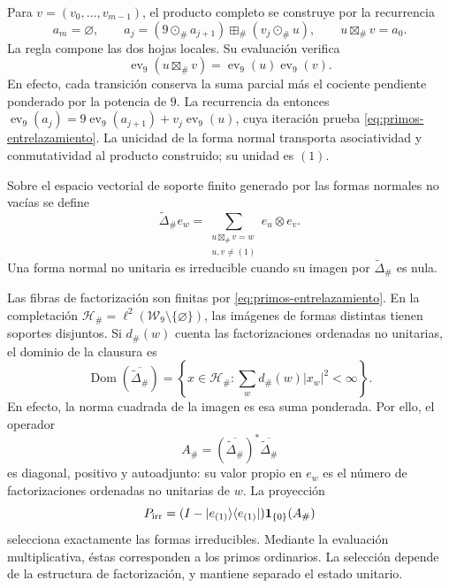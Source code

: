 Para \(v=(v_0,\ldots,v_{m-1})\), el producto completo se construye por
la recurrencia
\[
 a_m=\varnothing,\qquad
 a_j=(9\odot_\#a_{j+1})\boxplus_\#(v_j\odot_\#u),
 \qquad u\boxtimes_\#v=a_0.
\]
La regla compone las dos hojas locales. Su evaluación verifica
\begin{equation}
 \operatorname{ev}_9(u\boxtimes_\#v)
   =\operatorname{ev}_9(u)\operatorname{ev}_9(v).
 \label{eq:primos-entrelazamiento}
\end{equation}
En efecto, cada transición conserva la suma parcial más el cociente
pendiente ponderado por la potencia de \(9\). La recurrencia da entonces
\(\operatorname{ev}_9(a_j)=9\operatorname{ev}_9(a_{j+1})+
v_j\operatorname{ev}_9(u)\), cuya iteración prueba
\eqref{eq:primos-entrelazamiento}. La unicidad de la forma normal transporta
asociatividad y conmutatividad al producto construido; su unidad es \((1)\).

\begin{definition}
Sobre el espacio vectorial de soporte finito generado por las formas
normales no vacías se define
\[
 \widetilde\Delta_\# e_w
 =\sum_{\substack{u\boxtimes_\#v=w\\u,v\ne(1)}}e_u\otimes e_v.
\]
Una forma normal no unitaria es irreducible cuando su imagen por
\(\widetilde\Delta_\#\) es nula.
\end{definition}

Las fibras de factorización son finitas por
\eqref{eq:primos-entrelazamiento}. En la completación
\(\mathcal H_\#=\ell^2(\mathcal W_9\setminus\{\varnothing\})\),
las imágenes de formas distintas tienen soportes disjuntos. Si
\(d_\#(w)\) cuenta las factorizaciones ordenadas no unitarias, el dominio
de la clausura es
\[
 \operatorname{Dom}(\overline{\widetilde\Delta_\#})
 =\left\{x\in\mathcal H_\#:
       \sum_w d_\#(w)|x_w|^2<\infty\right\}.
\]
En efecto, la norma cuadrada de la imagen es esa suma ponderada. Por ello,
el operador
\[
 A_\#=(\overline{\widetilde\Delta_\#})^*
                  \overline{\widetilde\Delta_\#}
\]
es diagonal, positivo y autoadjunto: su valor propio en \(e_w\) es el
número de factorizaciones ordenadas no unitarias de \(w\). La proyección
\[
 P_{\rm irr}=(I-|e_{(1)}\rangle\langle e_{(1)}|)
                    \mathbf1_{\{0\}}(A_\#)
\]
selecciona exactamente las formas irreducibles. Mediante la evaluación
multiplicativa, éstas corresponden a los primos ordinarios. La selección
depende de la estructura de factorización, y mantiene separado el estado
unitario.

